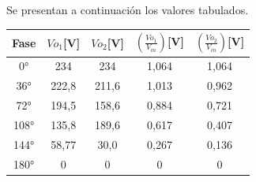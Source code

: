 Se presentan a continuación los valores tabulados.

\begin{table}[H]
\centering
  \begin{tabular}{|c|c|c|c|c|}
    \hline
      Fase & $Vo_1$[V] & $Vo_2$[V] & $(\frac{Vo_1}{V_{in}})$[V] & $(\frac{Vo_2}{V_{in}})$[V] \\
    \hline
      0°    & 234     & 234     & 1,064   & 1,064\\
      36°   & 222,8   & 211,6   & 1,013   & 0,962\\
      72°   & 194,5   & 158,6   & 0,884   & 0,721\\
      108°  & 135,8   & 189,6   & 0,617   & 0,407\\
      144°  & 58,77   & 30,0    & 0,267   & 0,136\\
      180°  & 0       & 0       & 0       & 0\\
    \hline
  \end{tabular}
\end{table}



